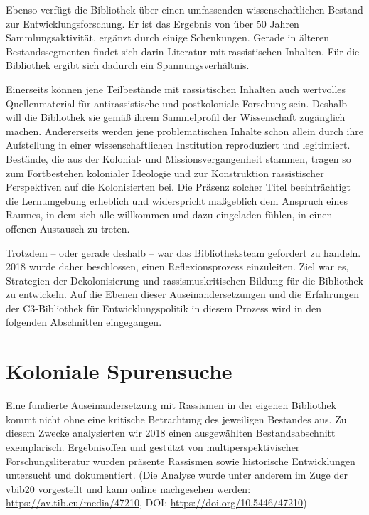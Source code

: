 \documentclass[a4paper,
fontsize=11pt,
oneside,
numbers=noperiodatend,
parskip=half-,
bibliography=totoc,
final
]{scrartcl}
\begin{document}
Ebenso verfügt die Bibliothek über einen umfassenden wissenschaftlichen
Bestand zur Entwicklungsforschung. Er ist das Ergebnis von über 50
Jahren Sammlungsaktivität, ergänzt durch einige Schenkungen. Gerade in
älteren Bestandssegmenten findet sich darin Literatur mit rassistischen
Inhalten. Für die Bibliothek ergibt sich dadurch ein
Spannungsverhältnis.

Einerseits können jene Teilbestände mit rassistischen Inhalten auch
wertvolles Quellenmaterial für antirassistische und postkoloniale
Forschung sein. Deshalb will die Bibliothek sie gemäß ihrem Sammelprofil
der Wissenschaft zugänglich machen. Andererseits werden jene
problematischen Inhalte schon allein durch ihre Aufstellung in einer
wissenschaftlichen Institution reproduziert und legitimiert. Bestände,
die aus der Kolonial- und Missionsvergangenheit stammen, tragen so zum
Fortbestehen kolonialer Ideologie und zur Konstruktion rassistischer
Perspektiven auf die Kolonisierten bei. Die Präsenz solcher Titel
beeinträchtigt die Lernumgebung erheblich und widerspricht maßgeblich
dem Anspruch eines Raumes, in dem sich alle willkommen und dazu
eingeladen fühlen, in einen offenen Austausch zu treten.

Trotzdem -- oder gerade deshalb -- war das Bibliotheksteam gefordert zu
handeln. 2018 wurde daher beschlossen, einen Reflexionsprozess
einzuleiten. Ziel war es, Strategien der Dekolonisierung und
rassismuskritischen Bildung für die Bibliothek zu entwickeln. Auf die
Ebenen dieser Auseinandersetzungen und die Erfahrungen der C3-Bibliothek
für Entwicklungspolitik in diesem Prozess wird in den folgenden
Abschnitten eingegangen.

\hypertarget{koloniale-spurensuche}{%
\section{Koloniale Spurensuche}\label{koloniale-spurensuche}}

Eine fundierte Auseinandersetzung mit Rassismen in der eigenen
Bibliothek kommt nicht ohne eine kritische Betrachtung des jeweiligen
Bestandes aus. Zu diesem Zwecke analysierten wir 2018 einen ausgewählten
Bestandsabschnitt exemplarisch. Ergebnisoffen und gestützt von
multiperspektivischer Forschungsliteratur wurden präsente Rassismen
sowie historische Entwicklungen untersucht und dokumentiert. (Die
Analyse wurde unter anderem im Zuge der vbib20 vorgestellt und kann
online nachgesehen werden: \url{https://av.tib.eu/media/47210}, DOI:
\url{https://doi.org/10.5446/47210})
\end{document}

